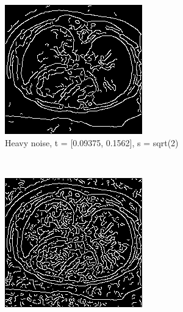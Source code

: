 \begin{figure}[H]
  \centering
  
	\begin{subfigure}{.5\textwidth}
    \centering
    \includegraphics[width=.9\textwidth]{./edgedetection/canny_heavy_noise/h_noise_insens_l_thres}
    \caption{Heavy noise, t = [0.09375, 0.1562], s = sqrt(2)}
    \label{fig:h_noise_insens_l_thres}
  \end{subfigure}\\%
    \begin{subfigure}{.5\textwidth}
    \centering
    \includegraphics[width=.9\textwidth]{./edgedetection/canny_heavy_noise/h_noise_sens_h_thres}

\end{subfigure}
\end{figure}
